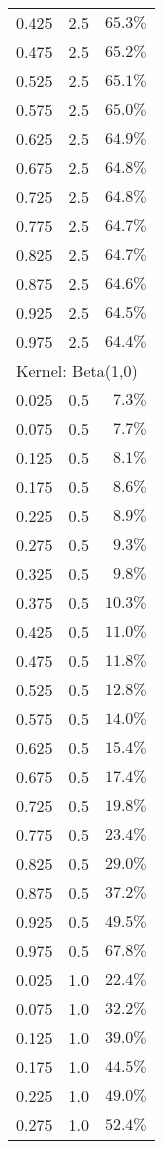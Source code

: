 \begin{longtable}{rrr}
0.425 & 2.5 & $65.3\%$ \\ 
0.475 & 2.5 & $65.2\%$ \\ 
0.525 & 2.5 & $65.1\%$ \\ 
0.575 & 2.5 & $65.0\%$ \\ 
0.625 & 2.5 & $64.9\%$ \\ 
0.675 & 2.5 & $64.8\%$ \\ 
0.725 & 2.5 & $64.8\%$ \\ 
0.775 & 2.5 & $64.7\%$ \\ 
0.825 & 2.5 & $64.7\%$ \\ 
0.875 & 2.5 & $64.6\%$ \\ 
0.925 & 2.5 & $64.5\%$ \\ 
0.975 & 2.5 & $64.4\%$ \\ 
\midrule
\multicolumn{3}{l}{Kernel: Beta(1,0)} \\ 
\midrule
0.025 & 0.5 & $7.3\%$ \\ 
0.075 & 0.5 & $7.7\%$ \\ 
0.125 & 0.5 & $8.1\%$ \\ 
0.175 & 0.5 & $8.6\%$ \\ 
0.225 & 0.5 & $8.9\%$ \\ 
0.275 & 0.5 & $9.3\%$ \\ 
0.325 & 0.5 & $9.8\%$ \\ 
0.375 & 0.5 & $10.3\%$ \\ 
0.425 & 0.5 & $11.0\%$ \\ 
0.475 & 0.5 & $11.8\%$ \\ 
0.525 & 0.5 & $12.8\%$ \\ 
0.575 & 0.5 & $14.0\%$ \\ 
0.625 & 0.5 & $15.4\%$ \\ 
0.675 & 0.5 & $17.4\%$ \\ 
0.725 & 0.5 & $19.8\%$ \\ 
0.775 & 0.5 & $23.4\%$ \\ 
0.825 & 0.5 & $29.0\%$ \\ 
0.875 & 0.5 & $37.2\%$ \\ 
0.925 & 0.5 & $49.5\%$ \\ 
0.975 & 0.5 & $67.8\%$ \\ 
0.025 & 1.0 & $22.4\%$ \\ 
0.075 & 1.0 & $32.2\%$ \\ 
0.125 & 1.0 & $39.0\%$ \\ 
0.175 & 1.0 & $44.5\%$ \\ 
0.225 & 1.0 & $49.0\%$ \\ 
0.275 & 1.0 & $52.4\%$ \\ 

\end{longtable}
